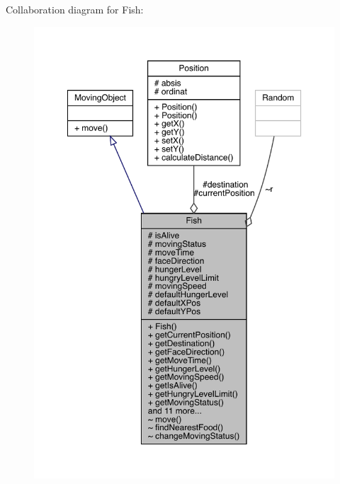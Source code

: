 Collaboration diagram for Fish\+:
\nopagebreak
\begin{figure}[H]
\begin{center}
\leavevmode
\includegraphics[width=350pt]{class_fish__coll__graph}
\end{center}
\end{figure}
